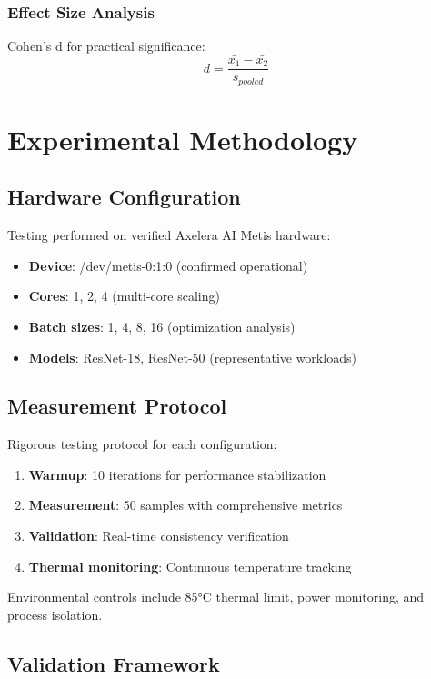 \documentclass[sigconf]{acmart}
\begin{document}
\subsubsection{Effect Size Analysis}
Cohen's d for practical significance:
\begin{equation}
d = \frac{\bar{x_1} - \bar{x_2}}{s_{pooled}}
\end{equation}

\section{Experimental Methodology}

\subsection{Hardware Configuration}

Testing performed on verified Axelera AI Metis hardware:
\begin{itemize}
    \item \textbf{Device}: /dev/metis-0:1:0 (confirmed operational)
    \item \textbf{Cores}: 1, 2, 4 (multi-core scaling)
    \item \textbf{Batch sizes}: 1, 4, 8, 16 (optimization analysis)
    \item \textbf{Models}: ResNet-18, ResNet-50 (representative workloads)
\end{itemize}

\subsection{Measurement Protocol}

Rigorous testing protocol for each configuration:
\begin{enumerate}
    \item \textbf{Warmup}: 10 iterations for performance stabilization
    \item \textbf{Measurement}: 50 samples with comprehensive metrics
    \item \textbf{Validation}: Real-time consistency verification
    \item \textbf{Thermal monitoring}: Continuous temperature tracking
\end{enumerate}

Environmental controls include 85°C thermal limit, power monitoring, and process isolation.

\subsection{Validation Framework}
\end{document}
